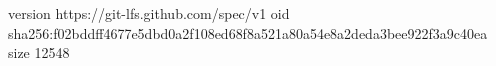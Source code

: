version https://git-lfs.github.com/spec/v1
oid sha256:f02bddff4677e5dbd0a2f108ed68f8a521a80a54e8a2deda3bee922f3a9c40ea
size 12548
